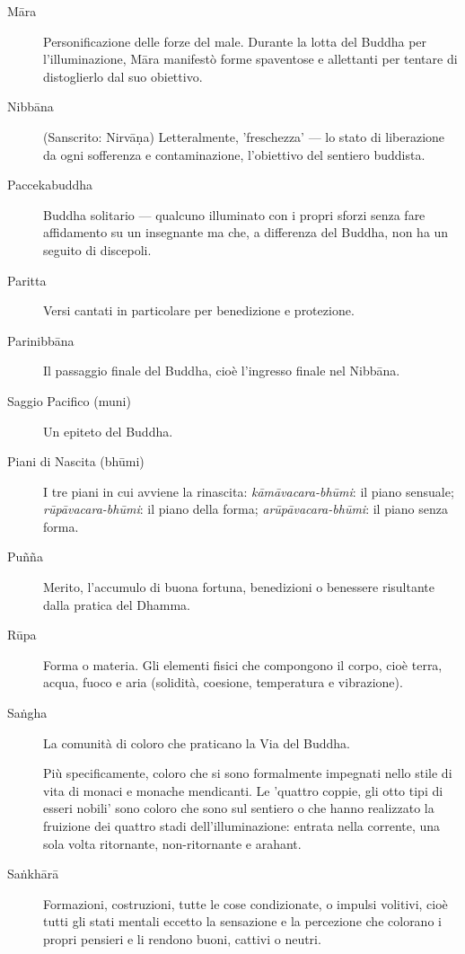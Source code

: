 \begin{description}
\item[Māra] Personificazione delle forze del male. Durante la lotta del Buddha
  per l'illuminazione, Māra manifestò forme spaventose e allettanti per
  tentare di distoglierlo dal suo obiettivo.

\item[Nibbāna] (Sanscrito: Nirvāṇa) Letteralmente, 'freschezza' --- lo stato di
  liberazione da ogni sofferenza e contaminazione, l'obiettivo del
  sentiero buddista.

\item[Paccekabuddha] Buddha solitario --- qualcuno illuminato con i propri
  sforzi senza fare affidamento su un insegnante ma che, a differenza del Buddha, non ha
  un seguito di discepoli.

\item[Paritta] Versi cantati in particolare per benedizione e protezione.

\item[Parinibbāna] Il passaggio finale del Buddha, cioè l'ingresso finale nel
  Nibbāna.

\item[Saggio Pacifico (muni)] Un epiteto del Buddha.

\item[Piani di Nascita (bhūmi)] I tre piani in cui avviene la rinascita:
  \emph{kāmāvacara-bhūmi}: il piano sensuale;
  \emph{rūpāvacara-bhūmi}: il piano della forma; \emph{arūpāvacara-bhūmi}: il piano
  senza forma.

\item[Puñña] Merito, l'accumulo di buona fortuna, benedizioni o
  benessere risultante dalla pratica del Dhamma.

\item[Rūpa] Forma o materia. Gli elementi fisici che compongono il corpo,
  cioè terra, acqua, fuoco e aria (solidità, coesione, temperatura e
  vibrazione).

\item[Saṅgha] La comunità di coloro che praticano la Via del Buddha.

  Più specificamente, coloro che si sono formalmente impegnati nello stile di vita
  di monaci e monache mendicanti. Le 'quattro coppie, gli otto tipi di
  esseri nobili' sono coloro che sono sul sentiero o che hanno realizzato la
  fruizione dei quattro stadi dell'illuminazione: entrata nella corrente, una sola volta ritornante,
  non-ritornante e arahant.

\item[Saṅkhārā] Formazioni, costruzioni, tutte le cose condizionate, o impulsi
  volitivi, cioè tutti gli stati mentali eccetto la sensazione e la percezione
  che colorano i propri pensieri e li rendono buoni, cattivi o neutri.


\end{description}
